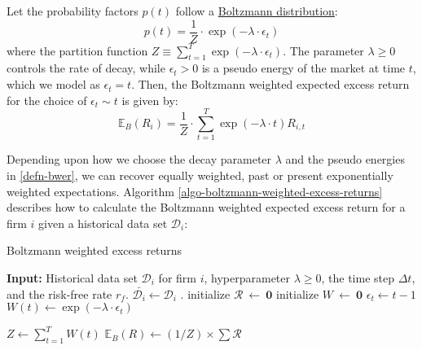 \documentclass[11pt]{article}
\theoremstyle{definition}
\begin{document}
\begin{definition}\label{defn-bwer}
Let the probability factors $p(t)$ follow a \href{https://en.wikipedia.org/wiki/Boltzmann_distribution}{Boltzmann distribution}:
\begin{equation*}\label{eqn-boltzmann-weight}
    p(t) = \frac{1}{Z}\cdot\exp(-\lambda\cdot\epsilon_{t})
\end{equation*}
where the partition function $Z \equiv \sum_{t=1}^{T}\exp(-\lambda\cdot\epsilon_{t})$.
The parameter $\lambda\geq{0}$ controls the rate of decay, while $\epsilon_{t}>0$ is a pseudo energy of the market at time $t$, 
which we model as $\epsilon_{t} = t$. Then, the Boltzmann weighted expected excess return for the choice of $\epsilon_{t} \sim t$ is given by: 
\begin{equation*}\label{eqn-boltzmann-weight-expectation}
    \mathbb{E}_{B}\left(R_{i}\right) = \frac{1}{Z}\cdot\sum_{t=1}^{T}\exp\left(-\lambda\cdot{t}\right){R}_{i,t}
\end{equation*}
\end{definition}
Depending upon how we choose the decay parameter $\lambda$ and the pseudo energies in \ref{defn-bwer}, we can recover 
equally weighted, past or present exponentially weighted expectations. Algorithm \ref{algo-boltzmann-weighted-excess-returns} 
describes how to calculate the Boltzmann weighted expected excess return for a firm $i$ given a historical data set $\mathcal{D}_{i}$:
\begin{algorithm}[h]
\caption{Boltzmann weighted excess returns}\label{algo-boltzmann-weighted-excess-returns}
\begin{algorithmic}[1]
\State \textbf{Input:} Historical data set $\mathcal{D}_{i}$ for firm $i$, hyperparameter $\lambda\geq{0}$, the time step $\Delta{t}$,
and the risk-free rate $r_{f}$.
\Statex
{}
\Statex
\State $\bar{\mathcal{D}_{i}}\leftarrow\mathcal{D}_{i}$ .
\State initialize $\mathcal{R}~\leftarrow~\mathbf{0}$ 
\State initialize $W~\leftarrow~\mathbf{0}$ 
\Statex
{}
\State $\epsilon_{t} \leftarrow t - 1$ 
\State $W(t) \leftarrow \exp(-\lambda\cdot\epsilon_{t})$ 
\EndFor

\Statex
\State $Z \leftarrow \sum_{t=1}^{T}W(t)$ 
\State $\mathbb{E}_{B}\left(R\right)\leftarrow(1/Z)\times\sum\mathcal{R}$ 
\EndProcedure

\end{algorithmic}
\end{algorithm}
\end{document}
